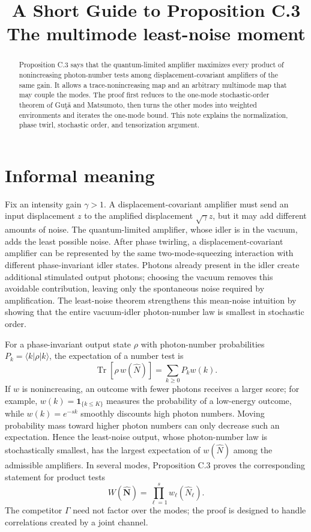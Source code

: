 \documentclass[11pt]{article}
\title{A Short Guide to Proposition C.3\\
\large The multimode least-noise moment}
\author{}
\date{}
\newcommand{\Tr}{\operatorname{Tr}}
\begin{document}
\maketitle

\begin{abstract}
Proposition C.3 says that the quantum-limited amplifier maximizes every
product of nonincreasing photon-number tests among displacement-covariant
amplifiers of the same gain.  It allows a trace-nonincreasing map and an
arbitrary multimode map that may couple the modes.  The proof first reduces
to the one-mode stochastic-order theorem of Gu\c{t}\u{a} and Matsumoto, then
turns the other modes into weighted environments and iterates the one-mode
bound.  This note explains the normalization, phase twirl, stochastic order,
and tensorization argument.
\end{abstract}

\section{Informal meaning}

Fix an intensity gain $\gamma>1$.  A displacement-covariant amplifier must
send an input displacement $z$ to the amplified displacement
$\sqrt\gamma z$, but it may add different amounts of noise.  The
quantum-limited amplifier, whose idler is in the vacuum, adds the least
possible noise.  After phase twirling, a displacement-covariant amplifier
can be represented by the same two-mode-squeezing interaction with different
phase-invariant idler states.  Photons already present in the idler create
additional stimulated output photons; choosing the vacuum removes this avoidable
contribution, leaving only the spontaneous noise required by amplification.
The least-noise theorem strengthens this mean-noise intuition by showing that
the entire vacuum-idler photon-number law is smallest in stochastic order.

For a phase-invariant output state $\rho$ with photon-number probabilities
$P_k=\langle k|\rho|k\rangle$, the expectation of a number test is
\[
  \Tr[\rho\,w(\widehat N)]=\sum_{k\ge0}P_k w(k).
\]
If $w$ is nonincreasing, an outcome with fewer photons receives a larger score;
for example, $w(k)=\boldsymbol 1_{\{k\le K\}}$ measures the probability of a
low-energy outcome, while $w(k)=e^{-sk}$ smoothly discounts high photon
numbers.  Moving probability mass toward higher photon numbers can only
decrease such an expectation.  Hence the least-noise output, whose
photon-number law is stochastically smallest, has the largest expectation of
$w(\widehat N)$ among the admissible amplifiers.  In several modes,
Proposition C.3 proves the corresponding statement for product tests
\[
  W(\widehat{\mathbf N})
  =\prod_{\ell=1}^s w_\ell(\widehat N_\ell).
\]
The competitor $\Gamma$ need not factor over the modes; the proof is designed
to handle correlations created by a joint channel.
\end{document}
